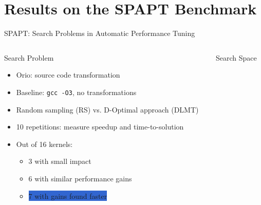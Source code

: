 \documentclass[10pt, compress, aspectratio=169, xcolor={table,usenames,dvipsnames}]{beamer}
\begin{document}
\section{Results on the SPAPT Benchmark}
\label{sec:org407f4f2}
\begin{frame}[label={sec:orgb012e61},fragile]{SPAPT: Search Problems in Automatic Performance Tuning}
 \begin{columns}
\begin{column}{0.41\columnwidth}
\begin{block}{Search Problem}
\begin{itemize}
\item \alert{Orio}: source code transformation
\item Baseline: \texttt{gcc -O3}, no transformations
\item Random sampling (\alert{RS}) vs. D-Optimal approach (\alert{DLMT})
\item 10 repetitions: measure \alert{speedup} and \alert{time-to-solution}
\item Out of 16 kernels:
\begin{itemize}
\item 3 with small impact
\item 6 with similar performance gains
\item \colorbox{Highlight}{7 with \alert{gains found faster}}
\end{itemize}
\end{itemize}
\end{block}
\end{column}
\begin{column}{0.59\columnwidth}
\begin{block}{Search Space}
\vspace{-0.4cm}


\end{block}
\end{column}
\end{columns}
\end{frame}
\end{document}
